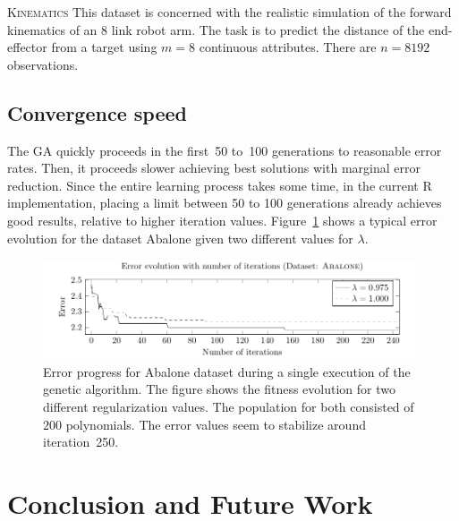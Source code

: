 \documentclass[preprint,authoryear,12pt]{elsarticle}
\begin{document}
\begin{description}

\item{\textsc{Kinematics}} This dataset is concerned with the realistic simulation of the forward kinematics of an 8 link robot arm. The task is to predict the distance of the end-effector from a target using $m=8$ continuous attributes. There are $n=8192$ observations. 


\end{description}

\subsection{Convergence speed}

The \ac{GA} quickly proceeds in the first~50 to~100 generations to reasonable error rates. Then, it proceeds slower achieving best solutions with marginal error reduction. Since the entire learning process takes some time, in the current R implementation, placing a limit between 50 to 100 generations already achieves good results, relative to higher iteration values. Figure~\ref{Abalone_fitnessProgress} shows a typical error evolution for the dataset Abalone given two different values for $\lambda$.

\begin{figure}[tb]
\begin{center}
\includegraphics[width=0.98\textwidth]{figure_4.pdf}
\caption{Error progress for Abalone dataset during a single execution of the genetic algorithm. The figure shows the fitness evolution for two different regularization values. The population for both consisted of $200$ polynomials. The error values seem to stabilize around iteration~250.}
\label{Abalone_fitnessProgress}

\end{center}
\end{figure}

\section{Conclusion and Future Work}
\end{document}
